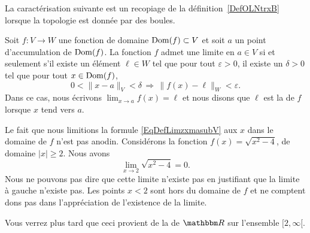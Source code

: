 La caractérisation suivante est un recopiage de la définition~\ref{DefOLNtrxB} lorsque la topologie est donnée par des boules.
\begin{proposition}\label{PropHOCWooSzrMjl}
	Soit $f\colon V\to W$ une fonction de domaine \( \operatorname{Dom}(f)\subset V\) et soit $a$ un point d'accumulation de $\operatorname{Dom}(f)$.
    La fonction \( f\) admet une limite en $a\in V$ si et seulement s'il existe un élément $\ell\in W$ tel que pour tout $\varepsilon>0$, il existe un $\delta>0$ tel que pour tout $x\in \operatorname{Dom}(f)$,
    \begin{equation}        \label{EqDefLimzxmasubV}
		0<\| x-a \|_V<\delta\,\Rightarrow\,\| f(x)-\ell \|_W<\varepsilon.
	\end{equation}
	Dans ce cas, nous écrivons $\lim_{x\to a} f(x)=\ell$ et nous disons que $\ell$ est la  de $f$ lorsque $x$ tend vers $a$.
\end{proposition}

\begin{remark}
    Le fait que nous limitions la formule \eqref{EqDefLimzxmasubV} aux \( x\) dans le domaine de \( f\) n'est pas anodin. Considérons la fonction \( f(x)=\sqrt{x^2-4}\), de domaine \( | x |\geq 2\). Nous avons
    \begin{equation}
        \lim_{x\to 2} \sqrt{x^2-4}=0.
    \end{equation}
    Nous ne pouvons pas dire que cette limite n'existe pas en justifiant que la limite à gauche n'existe pas. Les points \( x<2\) sont hors du domaine de \( f\) et ne comptent dons pas dans l'appréciation de l'existence de la limite.

    Vous verrez plus tard que ceci provient de la  de \( \eR\) sur l'ensemble \( \mathopen[ 2 , \infty [\).
\end{remark}
